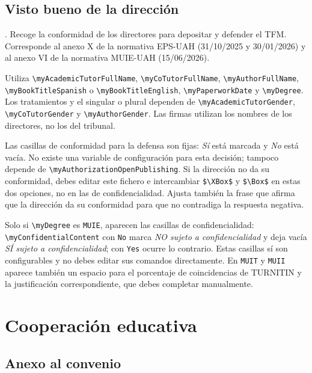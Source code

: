 \documentclass[10pt,a4paper]{article}
\newcommand{\variable}[1]{\texttt{\textbackslash{}}\nolinkurl{#1}}
\newcommand{\fichero}[1]{\path{#1}}
\begin{document}
\subsection{Visto bueno de la dirección}\label{form:visto-bueno}

\fichero{TFM-AnexoX-VistoBuenoTutor.tex}. Recoge la conformidad de los directores para depositar y defender el TFM. Corresponde al anexo X de la normativa EPS-UAH (31/10/2025 y 30/01/2026) y al anexo VI de la normativa MUIE-UAH (15/06/2026).

Utiliza \variable{myAcademicTutorFullName}, \variable{myCoTutorFullName}, \variable{myAuthorFullName}, \variable{myBookTitleSpanish} o \variable{myBookTitleEnglish}, \variable{myPaperworkDate} y \variable{myDegree}. Los tratamientos y el singular o plural dependen de \variable{myAcademicTutorGender}, \variable{myCoTutorGender} y \variable{myAuthorGender}. Las firmas utilizan los nombres de los directores, no los del tribunal.

Las casillas de conformidad para la defensa son fijas: \emph{Sí} está marcada y \emph{No} está vacía. No existe una variable de configuración para esta decisión; tampoco depende de \variable{myAuthorizationOpenPublishing}. Si la dirección no da su conformidad, debes editar este fichero e intercambiar \verb|$\XBox$| y \verb|$\Box$| en estas dos opciones, no en las de confidencialidad. Ajusta también la frase que afirma que la dirección da su conformidad para que no contradiga la respuesta negativa.

Solo si \variable{myDegree} es \texttt{MUIE}, aparecen las casillas de confidencialidad: \variable{myConfidentialContent} con \texttt{No} marca \emph{NO sujeto a confidencialidad} y deja vacía \emph{SÍ sujeto a confidencialidad}; con \texttt{Yes} ocurre lo contrario. Estas casillas sí son configurables y no debes editar sus comandos directamente. En \texttt{MUIT} y \texttt{MUII} aparece también un espacio para el porcentaje de coincidencias de TURNITIN y la justificación correspondiente, que debes completar manualmente.

\section{Cooperación educativa}

\subsection{Anexo al convenio}\label{form:convenio}
\end{document}
